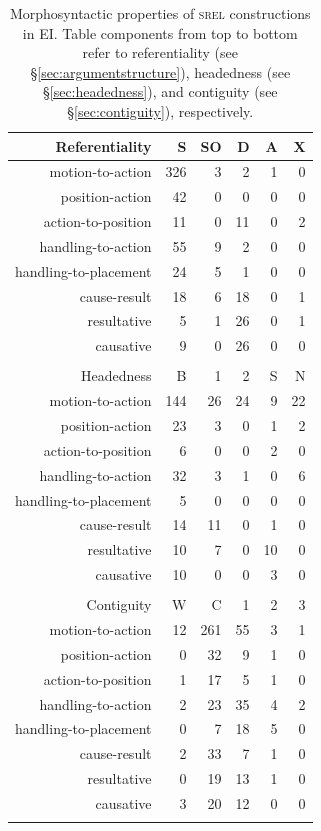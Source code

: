 \begin{table}
\centering
\begin{tabular}{rrrrrr}
  \lsptoprule
Referentiality & S & SO & D & A & X \\ 
  \midrule
  motion-to-action & 326 &   3 &   2 &   1 &   0 \\ 
  position-action &  42 &   0 &   0 &   0 &   0 \\ 
  action-to-position &  11 &   0 &  11 &   0 &   2 \\ 
  handling-to-action &  55 &   9 &   2 &   0 &   0 \\ 
  handling-to-placement &  24 &   5 &   1 &   0 &   0 \\ 
  cause-result &  18 &   6 &  18 &   0 &   1 \\ 
  resultative &   5 &   1 &  26 &   0 &   1 \\ 
  causative &   9 &   0 &  26 &   0 &   0 \\ 
   \midrule
 \\
  \midrule
Headedness & B & 1 & 2 & S & N \\ 
  \midrule
  motion-to-action & 144 &  26 &  24 &   9 &  22 \\ 
  position-action &  23 &   3 &   0 &   1 &   2 \\ 
  action-to-position &   6 &   0 &   0 &   2 &   0 \\ 
  handling-to-action &  32 &   3 &   1 &   0 &   6 \\ 
  handling-to-placement &   5 &   0 &   0 &   0 &   0 \\ 
  cause-result &  14 &  11 &   0 &   1 &   0 \\ 
  resultative &  10 &   7 &   0 &  10 &   0 \\ 
  causative &  10 &   0 &   0 &   3 &   0 \\ 
   \midrule
 \\
  \midrule
Contiguity & W & C & 1 & 2 & 3 \\ 
  \midrule
  motion-to-action &  12 & 261 &  55 &   3 &   1 \\ 
  position-action &   0 &  32 &   9 &   1 &   0 \\ 
  action-to-position &   1 &  17 &   5 &   1 &   0 \\ 
  handling-to-action &   2 &  23 &  35 &   4 &   2 \\ 
  handling-to-placement &   0 &   7 &  18 &   5 &   0 \\ 
  cause-result &   2 &  33 &   7 &   1 &   0 \\ 
  resultative &   0 &  19 &  13 &   1 &   0 \\ 
  causative &   3 &  20 &  12 &   0 &   0 \\ 
   \lspbottomrule
\end{tabular}
\caption[Morphosyntactic properties of \textsc{srel} constructions]{Morphosyntactic properties of \textsc{srel} constructions in EI. Table components from top to bottom refer to referentiality (see §\ref{sec:argumentstructure}), headedness (see §\ref{sec:headedness}), and contiguity (see §\ref{sec:contiguity}), respectively.}
\label{table:SREL_formal}
\end{table}

